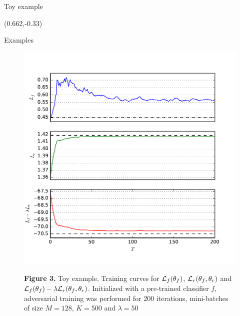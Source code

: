\documentclass[final,unknownkeysallowed]{beamer}
\begin{document}
\begin{frame}{}
\begin{textblock}{0.32}
\begin{block}{Toy example \phantom{p}}
\end{block}

\end{textblock}



\begin{textblock}{0.32}(0.662,-0.33)

\begin{block}{Examples \phantom{p}}

\vspace{-0.8cm}
\begin{figure}
\centering
\begin{minipage}{.42\linewidth}
    \begin{center}
        \includegraphics[width=\textwidth]{figures/training.pdf}\vspace{-1em}
    \end{center}
    {\bf Figure 3.} Toy example. Training curves for ${\cal L}_f(\theta_f)$, ${\cal L}_r(\theta_f, \theta_r)$
    and ${\cal L}_f(\theta_f) - \lambda {\cal L}_r(\theta_f, \theta_r)$.
    Initialized with a pre-trained classifier $f$, adversarial training was performed for $200$ iterations, mini-batches of size $M=128$, $K=500$ and $\lambda=50$
\end{minipage}
\hspace{.05\linewidth}

\end{figure}
\end{block}
\end{textblock}
\end{frame}
\end{document}
